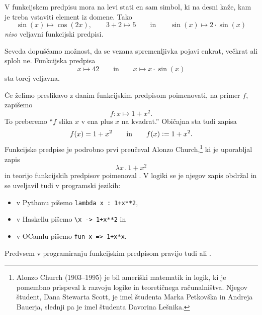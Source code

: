 V funkcijskem predpisu mora na levi stati en sam simbol, ki na desni kaže, kam je treba
vstaviti element iz domene. Tako
%
\begin{equation*}
  \sin(x) \mapsto \cos(2 x),
  \qquad
  3 + 2 \mapsto 5
  \qquad\text{in}\qquad
  \sin(x) \mapsto 2 \cdot \sin(x)
\end{equation*}
%
\emph{niso} veljavni funkcijski predpisi.

Seveda dopuščamo možnost, da se vezana spremenljivka pojavi enkrat, večkrat ali sploh ne.
Funkcijska predpisa
%
%
\begin{equation*}
  x \mapsto 42
  \qquad\text{in}\qquad
  x \mapsto x \cdot \sin(x)
\end{equation*}
%
sta torej veljavna.

Če želimo preslikavo z danim funkcijskim predpisom poimenovati, na primer $f$, zapišemo
%
\begin{equation*}
  f : x \mapsto 1 + x^2.
\end{equation*}
%
To preberemo ``$f$ slika $x$ v ena plus $x$ na kvadrat.'' Običajna sta tudi zapisa
%
\begin{equation*}
  f(x) = 1 + x^2
  \qquad\text{in}\qquad
  f(x) \mathrel{\mathop:}= 1 + x^2.
\end{equation*}
%
Funkcijske predpise je podrobno prvi preučeval Alonzo Church,\footnote{Alonzo Church
  (1903--1995) je bil ameriški matematik in logik, ki je pomembno prispeval k razvoju
  logike in teoretičnega računalništva. Njegov študent, Dana Stewarta Scott, je imel
  študenta Marka Petkovška in Andreja Bauerja, slednji pa je imel študenta Davorina
  Lešnika.} ki je uporabljal zapis
%
\begin{equation*}
  \lambda x \,.\, 1 + x^2
\end{equation*}
%
in teorijo funkcijskih predpisov poimenoval . V logiki se je njegov
zapis obdržal in se uveljavil tudi v programski jezikih:
%
\begin{itemize}
\item v Pythonu pišemo \verb|lambda x : 1+x**2|,
\item v Haskellu pišemo \verb|\x -> 1+x**2| in
\item v OCamlu pišemo \verb|fun x => 1+x*x|.
\end{itemize}
%
Predvsem v programiranju funkcijskim predpisom pravijo tudi  ali .


